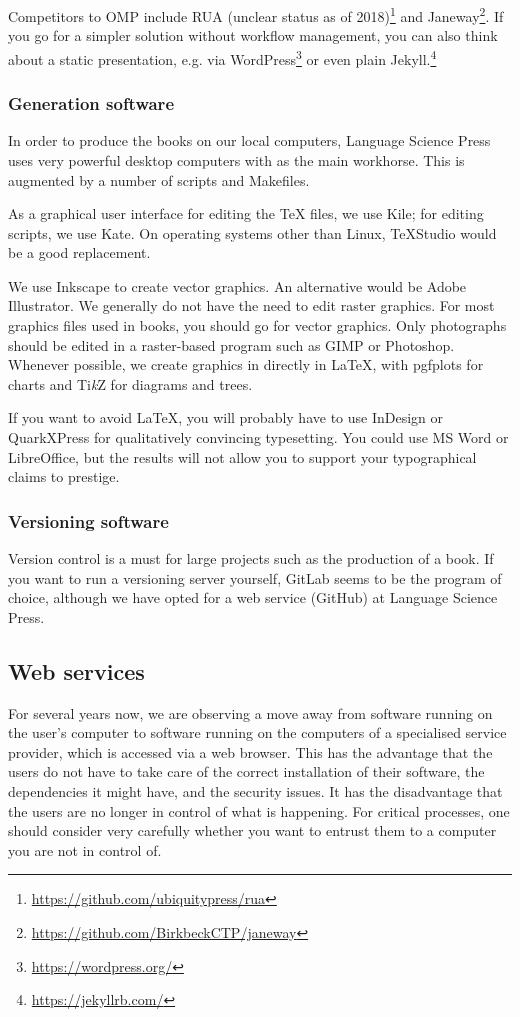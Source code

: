 \documentclass[nonflat,modfonts,output=book] {langsci/langscibook}
\newcommand{\footurl}[1]{\footnote{\url{#1}}}
\begin{document}
Competitors to OMP include RUA (unclear status as of 2018)\footurl{https://github.com/ubiquitypress/rua} and Janeway\footurl{https://github.com/BirkbeckCTP/janeway}. If you go for a simpler solution without workflow management, you can also think about a static presentation, e.g. via WordPress\footurl{https://wordpress.org/} or even plain Jekyll.\footurl{https://jekyllrb.com/} 

\subsubsection{Generation software}
In order to produce the books on our local computers, Language Science Press uses very powerful desktop computers with \xelatex as the main workhorse. This is augmented by a number of scripts and Makefiles. 

As a graphical user interface for editing the TeX files, we use Kile; for editing scripts, we use Kate. On operating systems other than Linux, TeXStudio would be a good replacement. 

We use Inkscape to create vector graphics. An alternative would be Adobe Illustrator. We generally do not have the need to edit raster graphics. For most graphics files used in books, you should go for vector graphics. Only photographs should be edited in a raster-based program such as GIMP or Photoshop. Whenever possible, we create graphics in directly in \LaTeX\xspace, with pgfplots for charts and Ti\textit{k}Z for diagrams and trees. 

If you want to avoid \LaTeX\xspace, you will probably have to use InDesign or QuarkXPress for qualitatively convincing typesetting. You could use MS Word or LibreOffice, but the results will not allow you to support your typographical claims to prestige.


\subsubsection{Versioning software}
Version control is a must for large projects such as the production of a book. If you want to run a versioning server yourself, GitLab seems to be the program of choice, although we have opted for a web service (GitHub) at Language Science Press. 

\subsection{Web services}
For several years now, we are observing a move away from software running on the user's computer to software running on the computers of a specialised service provider, which is accessed via a web browser. This has the advantage that the users do not have to take care of the correct installation of their software, the dependencies it might have, and the security issues. It has the disadvantage that the users are no longer in control of what is happening. For critical processes, one should consider very carefully whether you want to entrust them to a computer you are not in control of. 
\end{document}
